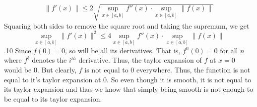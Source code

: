\documentclass[12pt]{exam}
\begin{document}
\begin{questions}
\[\|f'(x)\| \leq 2\sqrt{\sup_{x\in[a,b]}f''(x)\cdot \sup_{x\in[a,b]}\|f(x)\|}\] Squaring both sides to remove the square root and taking the supremum, we get \[\sup_{x\in[a,b]}\|f'(x)\|^2 \leq 4\sup_{x\in[a,b]}f''(x)\cdot \sup_{x\in[a,b]}\|f(x)\|\]
.10 \newline
Since $f(0)=0$, so will be all its derivatives. That is, $f^n(0)=0$ for all $n$ where $f^i$ denotes the $i^{th}$ derivative. Thus, the taylor expansion of $f$ at $x=0$ would be $0$. But clearly, $f$ is not equal to $0$ everywhere. Thus, the function is not equal to it's taylor expansion at $0$. So even though it is smooth, it is not equal to its taylor expansion and thus we know that simply being smooth is not enough to be equal to its taylor expansion. 

\end{questions}
\end{document}
